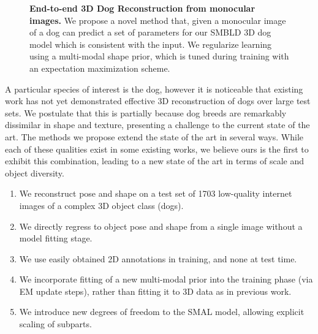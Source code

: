 \def\E#1{E_\textrm{#1}}
\def\L#1{L_{\textrm{#1}}}
\newcommand\inv[1]{\left.#1\right.^{-1}}
\newcommand\transpose[1]{\left.#1\right.^{T}}
\newcommand{\anote}[1]{{\color{red}[#1]}}
\def\ss#1{\vspace{-0ex}\subsubsection{#1}}

\begin{figure}[t]
\medbreak
\caption{
\textbf{End-to-end 3D Dog Reconstruction from monocular images.}
We propose a novel method that, given a monocular image of a dog can predict a set of parameters for our SMBLD 3D dog model which is consistent with the input. We regularize learning using a multi-modal shape prior, which is tuned during training with an expectation maximization scheme.\label{fig:splash}}
\end{figure}

A particular species of interest is the dog, however it is noticeable that existing work has not yet demonstrated effective 3D reconstruction of dogs over large test sets.
We postulate that this is partially because dog breeds are remarkably dissimilar in shape and texture, presenting a challenge to the current state of the art.
The methods we propose extend the state of the art in several ways.
While each of these qualities exist in some existing works, we believe ours is the first to exhibit this combination, leading to a new state of the art in terms of scale and object diversity.
\begin{enumerate}
    \item We reconstruct pose and shape on a test set of 1703 low-quality internet images of a complex 3D object class (dogs).
    \item We directly regress to object pose and shape from a single image without a model fitting stage.
    \item We use easily obtained 2D annotations in training, and none at test time.
    \item We incorporate fitting of a new multi-modal prior into the training phase (via EM update steps), rather than fitting it to 3D data as in previous work.
    \item We introduce new degrees of freedom to the SMAL model, 
    allowing explicit scaling of subparts.
\end{enumerate}

